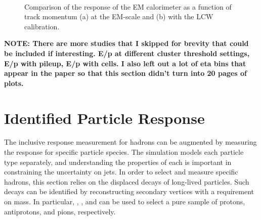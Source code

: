 \begin{figure}[htbp]
\centering
{}
~
\caption{Comparison of the response of the EM calorimeter as a function of track momentum (a) at the EM-scale and (b) with the LCW calibration.}
\label{fig:epcor_ecal}
\end{figure}


\textbf{NOTE: There are more studies that I skipped for brevity that could be included if interesting. E/p at different cluster threshold settings, E/p with pileup, E/p with cells. I also left out a lot of eta bins that appear in the paper so that this section didn't turn into 20 pages of plots.}


\section{Identified Particle Response}
\label{sec:identified}

The inclusive response measurement for hadrons can be augmented by measuring the response for specific particle species. 
The simulation models each particle type separately, and understanding the properties of each is important in constraining the uncertainty on jets. 
In order to select and measure specific hadrons, this section relies on the displaced decays of long-lived particles. 
Such decays can be identified by reconstructing secondary vertices with a requirement on mass.
In particular, \pL, \pLB, and \pKS can be used to select a pure sample of protons, antiprotons, and pions, respectively. 


